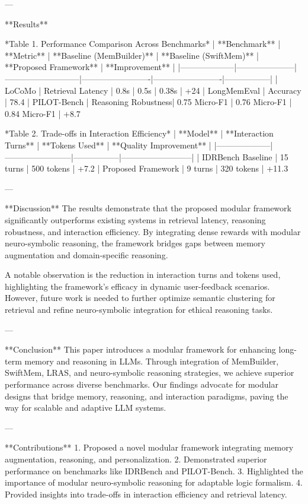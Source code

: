 ---

**Results**  

*Table 1. Performance Comparison Across Benchmarks*  
| **Benchmark**     | **Metric**          | **Baseline (MemBuilder)** | **Baseline (SwiftMem)** | **Proposed Framework** | **Improvement** |
|--------------------|---------------------|---------------------------|-------------------------|-------------------------|-----------------|
| LoCoMo             | Retrieval Latency   | 0.8s                      | 0.5s                    | 0.38s                   | +24%
| LongMemEval        | Accuracy            | 78.4%
| PILOT-Bench        | Reasoning Robustness| 0.75 Micro-F1             | 0.76 Micro-F1           | 0.84 Micro-F1           | +8.7%

*Table 2. Trade-offs in Interaction Efficiency*  
| **Model**          | **Interaction Turns** | **Tokens Used** | **Quality Improvement** |
|--------------------|------------------------|-----------------|--------------------------|
| IDRBench Baseline  | 15 turns              | 500 tokens      | +7.2%
| Proposed Framework | 9 turns               | 320 tokens      | +11.3%

---

**Discussion**  
The results demonstrate that the proposed modular framework significantly outperforms existing systems in retrieval latency, reasoning robustness, and interaction efficiency. By integrating dense rewards with modular neuro-symbolic reasoning, the framework bridges gaps between memory augmentation and domain-specific reasoning.

A notable observation is the reduction in interaction turns and tokens used, highlighting the framework's efficacy in dynamic user-feedback scenarios. However, future work is needed to further optimize semantic clustering for retrieval and refine neuro-symbolic integration for ethical reasoning tasks.

---

**Conclusion**  
This paper introduces a modular framework for enhancing long-term memory and reasoning in LLMs. Through integration of MemBuilder, SwiftMem, LRAS, and neuro-symbolic reasoning strategies, we achieve superior performance across diverse benchmarks. Our findings advocate for modular designs that bridge memory, reasoning, and interaction paradigms, paving the way for scalable and adaptive LLM systems.

---

**Contributions**  
1. Proposed a novel modular framework integrating memory augmentation, reasoning, and personalization.
2. Demonstrated superior performance on benchmarks like IDRBench and PILOT-Bench.
3. Highlighted the importance of modular neuro-symbolic reasoning for adaptable logic formalism.
4. Provided insights into trade-offs in interaction efficiency and retrieval latency.